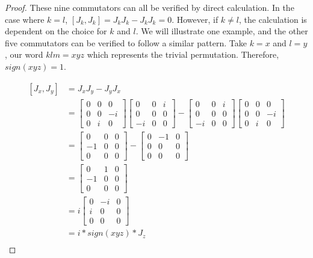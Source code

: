 \noindent\begin{proof} These nine commutators can all be verified by direct calculation. In the case where $k=l$, $[J_k,J_k] = J_kJ_k - J_kJ_k = 0$. However, if $k\neq l$, the calculation is dependent on the choice for $k$ and $l$. We will illustrate one example, and the other five commutators can be verified to follow a similar pattern. Take $k=x$ and $l=y$, our word $klm=xyz$ which represents the trivial permutation. Therefore, $sign(xyz)=1$.

\begin{equation}
	\begin{aligned}
		[J_x,J_y] &= J_xJ_y - J_yJ_x \\
					&= \begin{bmatrix}
							0 & 0 & 0\\
							0 & 0 & -i\\
							0 & i & 0
						\end{bmatrix}
						 \begin{bmatrix}
							0 & 0 & i\\
							0 & 0 & 0\\
							-i & 0 & 0
						\end{bmatrix}
						-
						\begin{bmatrix}
							0 & 0 & i\\
							0 & 0 & 0\\
							-i & 0 & 0
						\end{bmatrix}
						 \begin{bmatrix}
							0 & 0 & 0\\
							0 & 0 & -i\\
							0 & i & 0
						\end{bmatrix}\\
					&=  \begin{bmatrix}
							0 & 0 & 0\\
							-1 & 0 & 0\\
							0 & 0 & 0
						\end{bmatrix}
						-
						 \begin{bmatrix}
							0 & -1 & 0\\
							0 & 0 & 0\\
							0 & 0 & 0
						\end{bmatrix} \\
					&= \begin{bmatrix}
							0 & 1 & 0\\
							-1 & 0 & 0\\
							0 & 0 & 0
						\end{bmatrix} \\
					&=i \begin{bmatrix}
							0 & -i & 0\\
							i & 0 & 0\\
							0 & 0 & 0
						\end{bmatrix} \\
					&= i*sign(xyz)*J_z\\
	\end{aligned}
\end{equation} 


\end{proof}
